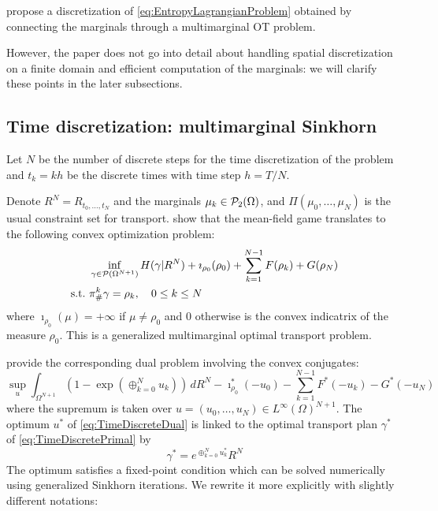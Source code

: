 \documentclass[../report.tex]{subfiles}
\begin{document}
\textcite{benamou2018entropy} propose a discretization of \eqref{eq:EntropyLagrangianProblem} obtained by connecting the marginals through a multimarginal OT problem.

However, the paper does not go into detail about handling spatial discretization on a finite domain and efficient computation of the marginals: we will clarify these points in the later subsections.


\subsection{Time discretization: multimarginal Sinkhorn}\label{sec:MMOT}

Let $N$ be the number of discrete steps for the time discretization of the problem and $t_k = kh$ be the discrete times with time step $h=T/N$.

Denote $R^N = R_{t_0,\ldots,t_N}$ and the marginals $\mu_k \in \mathcal{P}_2(\Omega)$, and $\Pi(\mu_0, \ldots, \mu_N)$ is the usual constraint set for transport. \textcite{benamou2018entropy} show that the mean-field game translates to the following convex optimization problem:
\begin{equation}\label{eq:TimeDiscretePrimal}
\begin{aligned}
&\inf_{\gamma \in \mathcal{P}(\Omega^{N+1})}
H(\gamma | R^N) + \imath_{\rho_0}(\rho_0) + \sum_{k=1}^{N-1} F(\rho_k) + G(\rho_N) \\
\mathrm{s.t.}\ &\pi^k_\#\gamma = \rho_k, \quad 0\leq k\leq N
\end{aligned}
\end{equation}
where $\imath_{\rho_0}(\mu) = +\infty$ if $\mu\neq \rho_0$ and $0$ otherwise is the convex indicatrix of the measure $\rho_0$. This is a generalized multimarginal optimal transport problem.

\textcite{benamou2018entropy} provide the corresponding dual problem involving the convex conjugates:
\begin{equation}\label{eq:TimeDiscreteDual}
\sup_u
\int_{\Omega^{N+1}} \left(1-\exp\left(\oplus_{k=0}^N u_k\right)\right) \,dR^N
-\imath_{\rho_0}^*(-u_0) - \sum_{k=1}^{N-1} F^*(-u_k) - G^*(-u_N)
\end{equation}
where the supremum is taken over $u = (u_0,\ldots,u_N) \in L^\infty(\Omega)^{N+1}$. The optimum $u^*$ of \eqref{eq:TimeDiscreteDual} is linked to the optimal transport plan $\gamma^*$ of \eqref{eq:TimeDiscretePrimal} by
\begin{equation}
	\gamma^* = e^{\oplus_{k=0}^N u^*_k} R^N
\end{equation}
The optimum satisfies a fixed-point condition which can be solved numerically using generalized Sinkhorn iterations. We rewrite it more explicitly with slightly different notations:
\end{document}
